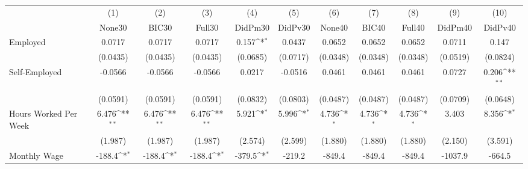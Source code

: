 {
\def\sym#1{\ifmmode^{#1}\else\(^{#1}\)\fi}
\begin{tabular}{l*{10}{c}}
\toprule
            &\multicolumn{1}{c}{(1)}&\multicolumn{1}{c}{(2)}&\multicolumn{1}{c}{(3)}&\multicolumn{1}{c}{(4)}&\multicolumn{1}{c}{(5)}&\multicolumn{1}{c}{(6)}&\multicolumn{1}{c}{(7)}&\multicolumn{1}{c}{(8)}&\multicolumn{1}{c}{(9)}&\multicolumn{1}{c}{(10)}\\
            &\multicolumn{1}{c}{None30}&\multicolumn{1}{c}{BIC30}&\multicolumn{1}{c}{Full30}&\multicolumn{1}{c}{DidPm30}&\multicolumn{1}{c}{DidPv30}&\multicolumn{1}{c}{None40}&\multicolumn{1}{c}{BIC40}&\multicolumn{1}{c}{Full40}&\multicolumn{1}{c}{DidPm40}&\multicolumn{1}{c}{DidPv40}\\
\midrule
Employed    &      0.0717         &      0.0717         &      0.0717         &       0.157\sym{*}  &      0.0437         &      0.0652         &      0.0652         &      0.0652         &      0.0711         &       0.147         \\
            &    (0.0435)         &    (0.0435)         &    (0.0435)         &    (0.0685)         &    (0.0717)         &    (0.0348)         &    (0.0348)         &    (0.0348)         &    (0.0519)         &    (0.0824)         \\
\addlinespace
Self-Employed&     -0.0566         &     -0.0566         &     -0.0566         &      0.0217         &     -0.0516         &      0.0461         &      0.0461         &      0.0461         &      0.0727         &       0.206\sym{**} \\
            &    (0.0591)         &    (0.0591)         &    (0.0591)         &    (0.0832)         &    (0.0803)         &    (0.0487)         &    (0.0487)         &    (0.0487)         &    (0.0709)         &    (0.0648)         \\
\addlinespace
Hours Worked Per Week&       6.476\sym{**} &       6.476\sym{**} &       6.476\sym{**} &       5.921\sym{*}  &       5.996\sym{*}  &       4.736\sym{*}  &       4.736\sym{*}  &       4.736\sym{*}  &       3.403         &       8.356\sym{*}  \\
            &     (1.987)         &     (1.987)         &     (1.987)         &     (2.574)         &     (2.599)         &     (1.880)         &     (1.880)         &     (1.880)         &     (2.150)         &     (3.591)         \\
\addlinespace
Monthly Wage&      -188.4\sym{*}  &      -188.4\sym{*}  &      -188.4\sym{*}  &      -379.5\sym{*}  &      -219.2         &      -849.4         &      -849.4         &      -849.4         &     -1037.9         &      -664.5         \\

\end{tabular}}
